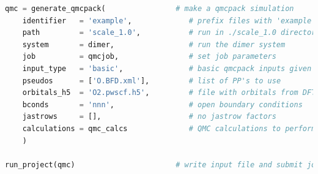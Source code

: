 \begin{lstlisting}[language=Python]
qmc = generate_qmcpack(                # make a qmcpack simulation 
    identifier   = 'example',             # prefix files with 'example'
    path         = 'scale_1.0',           # run in ./scale_1.0 directory
    system       = dimer,                 # run the dimer system
    job          = qmcjob,                # set job parameters
    input_type   = 'basic',               # basic qmcpack inputs given below    
    pseudos      = ['O.BFD.xml'],         # list of PP's to use
    orbitals_h5  = 'O2.pwscf.h5',         # file with orbitals from DFT
    bconds       = 'nnn',                 # open boundary conditions
    jastrows     = [],                    # no jastrow factors
    calculations = qmc_calcs              # QMC calculations to perform
    )
                       
run_project(qmc)                       # write input file and submit job
\end{lstlisting}

\else


